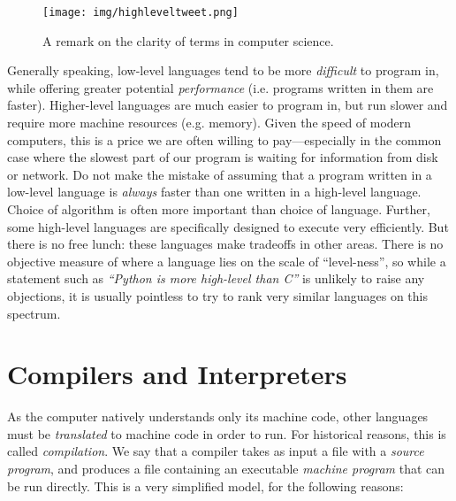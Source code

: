 \begin{figure}
  \centering
  \texttt{[image: img/highleveltweet.png]}
  \caption{A remark on the clarity of terms in computer science.}
  \label{fig:koronkebitch}
\end{figure}

Generally speaking, low-level languages tend to be more
\textit{difficult} to program in, while offering greater potential
\textit{performance} (i.e. programs written in them are faster).
Higher-level languages are much easier to program in, but run slower
and require more machine resources (e.g. memory).  Given the speed of
modern computers, this is a price we are often willing to
pay---especially in the common case where the slowest part of our
program is waiting for information from disk or network.  Do not make
the mistake of assuming that a program written in a low-level language
is \textit{always} faster than one written in a high-level language.
Choice of algorithm is often more important than choice of language.
Further, some high-level languages are specifically designed to
execute very efficiently.  But there is no free lunch: these languages
make tradeoffs in other areas.  There is no objective measure of where
a language lies on the scale of ``level-ness'', so while a statement
such as \textit{``Python is more high-level than C''} is unlikely to
raise any objections, it is usually pointless to try to rank very
similar languages on this spectrum.

\section{Compilers and Interpreters}

As the computer natively understands only its machine code, other
languages must be \textit{translated} to machine code in order to run.
For historical reasons, this is called \textit{compilation}.  We say
that a compiler takes as input a file with a \textit{source program},
and produces a file containing an executable \textit{machine program}
that can be run directly.  This is a very simplified model, for the
following reasons:

